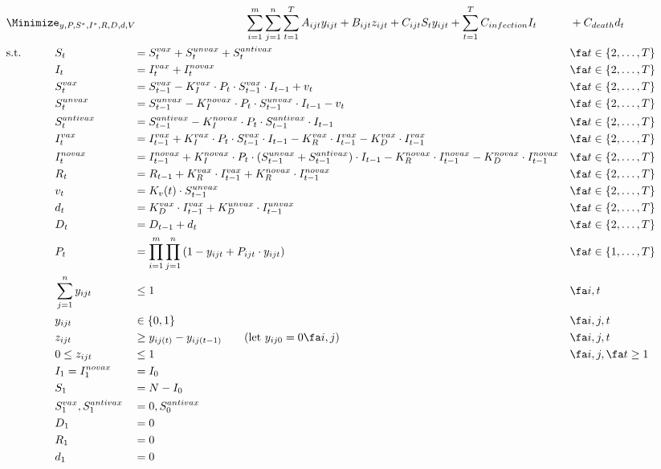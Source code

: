 \documentclass{article}
\begin{document}
{\small
    \begin{alignat*}{4}
        &\Minimize_{y,P,S^*,I^*,R,D,d,V}\qquad \span\span\span\span \sum_{i=1}^{m}\sum_{j=1}^{n}\sum_{t=1}^{T}A_{ijt} y_{ijt} + B_{ijt}z_{ijt} + C_{ijt} S_{t}  y_{ijt}  + \sum_{t=1}^{T}C_{infection} I_t &&+ C_{death}  d_t \\
        & \text{s.t.}\qquad  && S_t &&= S_t^{vax} + S_{t}^{unvax} + S_t^{antivax}&& \fa t \in \{2,\ldots,T\} \\
        & {} && I_t &&= I_t^{vax} + I_{t}^{novax} && \fa t \in \{2,\ldots,T\} \\
        & {} && S_t^{vax} &&= S_{t-1}^{vax} - K_I^{vax} \cdot P_t \cdot S_{t-1}^{vax} \cdot I_{t-1} + v_t && \fa t \in \{2,\ldots,T\} \\
        & {} && S_t^{unvax} &&= S_{t-1}^{unvax} - K_I^{novax} \cdot P_t \cdot S_{t-1}^{unvax} \cdot I_{t-1} - v_t && \fa t \in \{2,\ldots,T\} \\
        & {} && S_t^{antivax} &&= S_{t-1}^{antivax} - K_I^{novax} \cdot P_t \cdot S_{t-1}^{antivax} \cdot I_{t-1} && \fa t \in \{2,\ldots,T\} \\
        & {} && I_t^{vax} &&= I_{t-1}^{vax} + K_I^{vax} \cdot P_t \cdot S_{t-1}^{vax} \cdot I_{t-1} - K_R^{vax}\cdot I_{t-1}^{vax} - K_D^{vax} \cdot I_{t-1}^{vax} && \fa t \in \{2,\ldots,T\} \\
        & {} && I_t^{novax} &&= I_{t-1}^{novax} + K_I^{novax} \cdot P_t \cdot (S_{t-1}^{unvax} +S_{t-1}^{antivax}) \cdot I_{t-1} - K_R^{novax}\cdot I_{t-1}^{novax} - K_D^{novax} \cdot I_{t-1}^{novax} && \fa t \in \{2,\ldots,T\} \\
        & {} && R_t &&= R_{t-1} + K_R^{vax} \cdot I_{t-1}^{vax} + K_R^{novax} \cdot I_{t-1}^{novax} && \fa t \in \{2,\ldots,T\} \\
        & {} && v_t &&= K_v(t) \cdot S_{t-1}^{unvax} && \fa t \in \{2,\ldots,T\} \\
        & {} && d_t &&= K_D^{vax}\cdot I_{t-1}^{vax} + K_D^{unvax} \cdot I_{t-1}^{unvax} && \fa t \in \{2,\ldots,T\} \\
        & {} && D_t &&= D_{t-1} + d_t && \fa t \in \{2,\ldots,T\} \\
        & {} && P_t &&= \prod_{i=1}^{m}\prod_{j=1}^{n}\left(1-y_{ijt} + P_{ijt}\cdot y_{ijt}\right)&& \fa t \in \{1,\ldots,T\} \\
        & {} && \sum_{j=1}^{n}y_{ijt}  &&\le 1 && \fa i,t \\
        & {} && y_{ijt} &&\in \{0,1\} && \fa i,j,t \\
        & {} && z_{ijt} &&\ge y_{ij(t)}-y_{ij(t-1)} \text{\qquad(let $y_{ij0}=0 \fa i,j$)} && \fa i,j, t \\
        & {} && 0 \le z_{ijt} &&\le 1 && \fa i,j, \fa t\ge 1 \\
        & {} && I_1 = I_1^{novax}  &&= I_0 && \\
        & {} && S_1 &&= N - I_0 && \\
        & {} && S_1^{vax}, S_1^{antivax} &&= 0, S_0^{antivax} && \\
        & {} && D_1 &&= 0 && \\
        & {} && R_1 &&= 0 && \\
        & {} && d_1 &&= 0 &&
    \end{alignat*}
}
\end{document}
